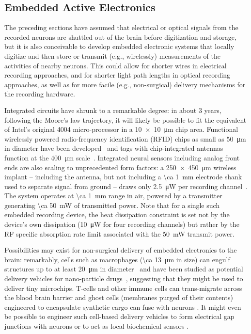 \subsection{Embedded Active Electronics}

The preceding sections have assumed that electrical or optical signals from the recorded neurons are shuttled out of the brain before digitization and storage, but it is also conceivable to develop embedded electronic systems that locally digitize and then store or transmit (e.g., wirelessly) measurements of the activities of nearby neurons.
This could allow for shorter wires in electrical recording approaches, and for shorter light path lengths in optical recording approaches, as well as for more facile (e.g., non-surgical) delivery mechanisms for the recording hardware.

Integrated circuits have shrunk to a remarkable degree: in about 3 years, following the Moore's law trajectory, it will likely be possible to fit the equivalent of Intel's original 4004 micro-processor in a \SI{10 x 10}{\micro\meter} chip area.
Functional wirelessly powered radio-frequency identification (RFID) chips as small as \SI{50}{\micro\meter} in diameter have been developed~\cite{Usami2007} and tags with chip-integrated antennas function at the \SI{400}{\micro\meter} scale~\cite{ImpinjMonzaFive}.
Integrated neural sensors including analog front ends are also scaling to unprecedented form factors: a \SI{250 x 450}{\micro\meter} wireless implant -- including the antenna, but not including a \SI{\ca 1}{\milli\meter} electrode shank used to separate signal from ground -- draws only \SI{2.5}{\micro\watt} per recording channel~\cite{biederman13}. The system operates at \SI{\ca 1}{\milli\meter} range in air, powered by a transmitter generating \SI{\ca 50}{\milli\watt} of transmitted power.
Note that for a single such embedded recording device, the heat dissipation constraint is set not by the device's own dissipation (\SI{10}{\micro\watt} for four recording channels) but rather by the RF specific absorption rate limit associated with the \SI{50}{\milli\watt} transmit power.

Possibilities may exist for non-surgical delivery of embedded electronics to the brain: remarkably, cells such as macrophages (\SI{\ca 13}{\micro\meter} in size) can engulf structures up to at least \SI{20}{\micro\meter} in diameter~\cite{cannon92} and have been studied as potential delivery vehicles for nano-particle drugs~\cite{Kadiu11}, suggesting that they might be used to deliver tiny microchips. T-cells and other immune cells can trans-migrate across the blood brain barrier \cite{Engelhardt2006} and ghost cells (membranes purged of their contents) engineered to encapsulate synthetic cargo \cite{Cinti2011} can fuse with neurons \cite{Hikawa1989162}. It might even be possible to engineer such cell-based delivery vehicles to form electrical gap junctions \cite{Spruston2001669} with neurons or to act as local biochemical sensors \cite{nguyen2009vivo}.


